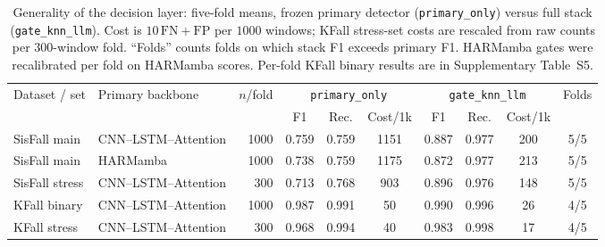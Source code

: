 \begin{table}[!t]
\centering
\caption{Generality of the decision layer: five-fold means, frozen primary detector (\texttt{primary\_only}) versus full stack (\texttt{gate\_knn\_llm}). Cost is $10\,\mathrm{FN}+\mathrm{FP}$ per $1000$ windows; KFall stress-set costs are rescaled from raw counts per $300$-window fold. ``Folds'' counts folds on which stack F1 exceeds primary F1. HARMamba gates were recalibrated per fold on HARMamba scores. Per-fold KFall binary results are in Supplementary Table~S5.}
\label{tab:generality}
\begin{tabular}{l l r ccc ccc c}
\toprule
Dataset / set & Primary backbone & $n$/fold & \multicolumn{3}{c}{\texttt{primary\_only}} & \multicolumn{3}{c}{\texttt{gate\_knn\_llm}} & Folds \\
\cmidrule(lr){4-6}\cmidrule(lr){7-9}
 & & & F1 & Rec. & Cost/1k & F1 & Rec. & Cost/1k & \\
\midrule
SisFall main   & CNN--LSTM--Attention & 1000 & 0.759 & 0.759 & 1151 & 0.887 & 0.977 & 200 & 5/5 \\
SisFall main   & HARMamba~\cite{li2025harmamba} & 1000 & 0.738 & 0.759 & 1175 & 0.872 & 0.977 & 213 & 5/5 \\
SisFall stress & CNN--LSTM--Attention & 300  & 0.713 & 0.768 & 903  & 0.896 & 0.976 & 148 & 5/5 \\
KFall binary   & CNN--LSTM--Attention & 1000 & 0.987 & 0.991 & 50   & 0.990 & 0.996 & 26  & 4/5 \\
KFall stress   & CNN--LSTM--Attention & 300  & 0.968 & 0.994 & 40   & 0.983 & 0.998 & 17  & 4/5 \\
\bottomrule
\end{tabular}
\end{table}

